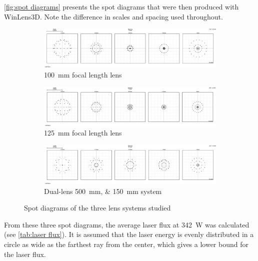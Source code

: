             \autoref{fig:spot diagrams} presents the spot diagrams that were then produced with WinLens3D. Note the difference in scales and spacing used throughout.
            \begin{figure}[!ht]
                \centering
                \begin{subfigure}[t]{\textwidth}
                    \centering
                    \includegraphics[width=\textwidth]{assets/3 design/100 lens spot diagram.png}
                    \caption{\qty{100}{mm} focal length lens}
                \end{subfigure}
                \begin{subfigure}[t]{\textwidth}
                    \centering
                    \includegraphics[width=\textwidth]{assets/3 design/125 lens spot diagram.png}
                    \caption{\qty{125}{mm} focal length lens}
                \end{subfigure}
                \begin{subfigure}[t]{\textwidth}
                    \centering
                    \includegraphics[width=\textwidth]{assets/3 design/500 and 150 lenses spot size.png}
                    \caption{Dual-lens \qtylist{500;150}{mm} system}
                \end{subfigure}
                \caption{Spot diagrams of the three lens systems studied}
                \label{fig:spot diagrams}
            \end{figure}
            From these three spot diagrams, the average laser flux at \qtylist{342}{W} was calculated (see \autoref{tab:laser flux}). It is assumed that the laser energy is evenly distributed in a circle as wide as the farthest ray from the center, which gives a lower bound for the laser flux.
